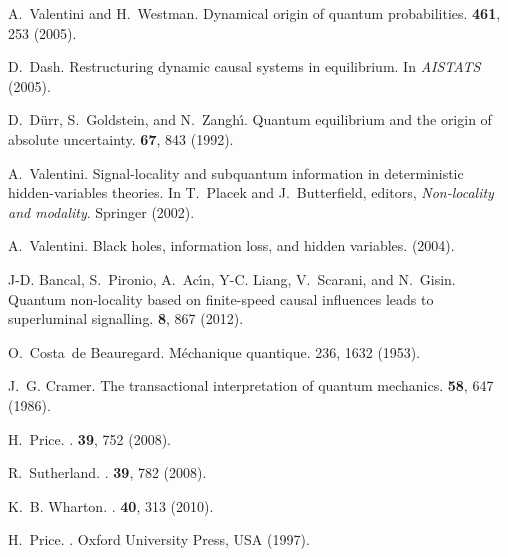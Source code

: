 \documentclass[letterpaper,onecolumn,nofootinbib]{revtex4}
\begin{document}
\begin{thebibliography}{10}
A.~Valentini and H.~Westman.
\newblock Dynamical origin of quantum probabilities.
 \textbf{461}, 253 
  (2005).
  
D.~Dash.
\newblock Restructuring dynamic causal systems in equilibrium.
\newblock In {\em AISTATS} (2005).
  
D.~D{\"u}rr, S.~Goldstein, and N.~Zangh{\'\i}.
\newblock Quantum equilibrium and the origin of absolute uncertainty.
 \textbf{67}, 843 (1992).  
 
A.~Valentini.
\newblock Signal-locality and subquantum information in deterministic
  hidden-variables theories.
\newblock In T.~Placek and J.~Butterfield, editors, {\em Non-locality and
  modality}. Springer (2002).

A.~Valentini.
\newblock Black holes, information loss, and hidden variables.
 (2004).  
  
J-D. Bancal, S.~Pironio, A.~Ac{\'{\i}}n, Y-C. Liang, V.~Scarani, and N.~Gisin.
\newblock Quantum non-locality based on finite-speed causal influences leads to
  superluminal signalling.
 \textbf{8}, 867 (2012).
  
O.~Costa~de Beauregard.
\newblock M{\'e}chanique quantique.
 236, 1632 (1953).

J.~G. Cramer.
\newblock The transactional interpretation of quantum mechanics.
 \textbf{58}, 647 (1986).

H.~Price.
.
  \textbf{39}, 752 (2008).

R.~Sutherland.
.
  \textbf{39}, 782 (2008).

K.~B. Wharton.
.
 \textbf{40}, 313 (2010).

H.~Price.
.
\newblock Oxford University Press, USA (1997).


\end{thebibliography}
\end{document}
